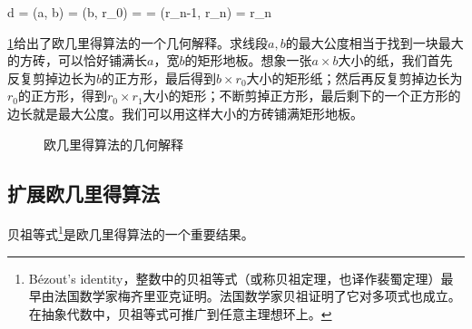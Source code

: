 \documentclass[b5paper]{ctexart}
\begin{document}
\be
d = (a, b) = (b, r_0) = \dotso = (r_{n-1}, r_n) = r_n
\label{eq:recursive-gcm}
\ee

\cref{fig:geometric-GCM}给出了欧几里得算法的一个几何解释。求线段$a, b$的最大公度相当于找到一块最大的方砖，可以恰好铺满长$a$，宽$b$的矩形地板。想象一张$a \times b$大小的纸，我们首先反复剪掉边长为$b$的正方形，最后得到$b \times r_0$大小的矩形纸；然后再反复剪掉边长为$r_0$的正方形，得到$r_0 \times r_1$大小的矩形；不断剪掉正方形，最后剩下的一个正方形的边长就是最大公度。我们可以用这样大小的方砖铺满矩形地板。

\begin{figure}[htbp]
 \centering
 \caption{欧几里得算法的几何解释}
 \label{fig:geometric-GCM}
\end{figure}

\subsection{扩展欧几里得算法}
 

贝祖等式\footnote{Bézout's identity，整数中的贝祖等式（或称贝祖定理，也译作裴蜀定理）最早由法国数学家梅齐里亚克证明。法国数学家贝祖证明了它对多项式也成立。在抽象代数中，贝祖等式可推广到任意主理想环上。}是欧几里得算法的一个重要结果。
\end{document}
